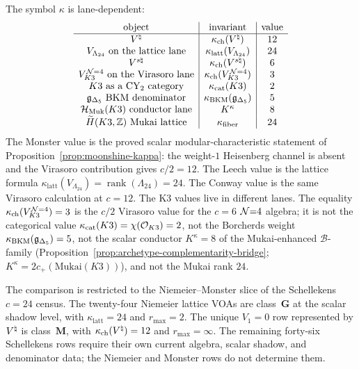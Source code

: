 \begin{remark}
\label{rem:moonshine-kappa-ch-table}
The symbol $\kappa$ is lane-dependent:
\[
\begin{array}{c|c|c}
\text{object} & \text{invariant} & \text{value}\\
\hline
V^{\natural} & \kappa_{\mathrm{ch}}(V^{\natural}) & 12\\
V_{\Lambda_{24}}\text{ on the lattice lane}
 & \kappa_{\mathrm{latt}}(V_{\Lambda_{24}}) & 24\\
V^{s\natural} & \kappa_{\mathrm{ch}}(V^{s\natural}) & 6\\
V_{K3}^{\mathcal N{=}4}\text{ on the Virasoro lane} & \kappa_{\mathrm{ch}}(V_{K3}^{\mathcal N{=}4}) & 3\\
K3\text{ as a CY}_2\text{ category} & \kappa_{\mathrm{cat}}(K3) & 2\\
\mathfrak g_{\Delta_5}\text{ BKM denominator} & \kappa_{\mathrm{BKM}}(\mathfrak g_{\Delta_5}) & 5\\
\mathcal H_{\mathrm{Muk}}(K3)\text{ conductor lane} & K^\kappa & 8\\
\widetilde H(K3,\mathbb Z)\text{ Mukai lattice} & \kappa_{\mathrm{fiber}} & 24
\end{array}
\]
The Monster value is the proved scalar modular-characteristic statement
of Proposition~\ref{prop:moonshine-kappa}: the weight-$1$ Heisenberg
channel is absent and the Virasoro contribution gives $c/2=12$.  The
Leech value is the lattice formula
$\kappa_{\mathrm{latt}}(V_{\Lambda_{24}})=\operatorname{rank}(\Lambda_{24})=24$.
The Conway value is the same Virasoro calculation at $c=12$.  The K3
values live in different lanes.  The equality
$\kappa_{\mathrm{ch}}(V_{K3}^{\mathcal N{=}4})=3$ is the $c/2$ Virasoro value for the $c=6$
$\mathcal N{=}4$ algebra; it is not the categorical value
$\kappa_{\mathrm{cat}}(K3)=\chi(\mathcal O_{K3})=2$, not the Borcherds weight
$\kappa_{\mathrm{BKM}}(\mathfrak g_{\Delta_5})=5$, not the scalar conductor
$K^\kappa=8$ of the Mukai-enhanced $\mathcal B$-family
\textup{(}Proposition~\ref{prop:archetype-complementarity-bridge};
$K^\kappa=2c_+(\mathrm{Mukai}(K3))$\textup{)}, and not the Mukai
rank $24$.
\end{remark}

\begin{remark}
\label{rem:moonshine-schellekens-niemeier-scope}
The comparison is restricted to the Niemeier--Monster slice of the
Schellekens $c=24$ census.  The twenty-four Niemeier lattice VOAs are
class~$\mathbf G$ at the scalar shadow level, with
$\kappa_{\mathrm{latt}}=24$ and $r_{\max}=2$.  The unique $V_1=0$ row
represented by $V^{\natural}$ is class~$\mathbf M$, with
$\kappa_{\mathrm{ch}}(V^{\natural})=12$ and $r_{\max}=\infty$.  The remaining forty-six
Schellekens rows require their own current algebra, scalar shadow, and
denominator data; the Niemeier and Monster rows do not determine them.
\end{remark}

